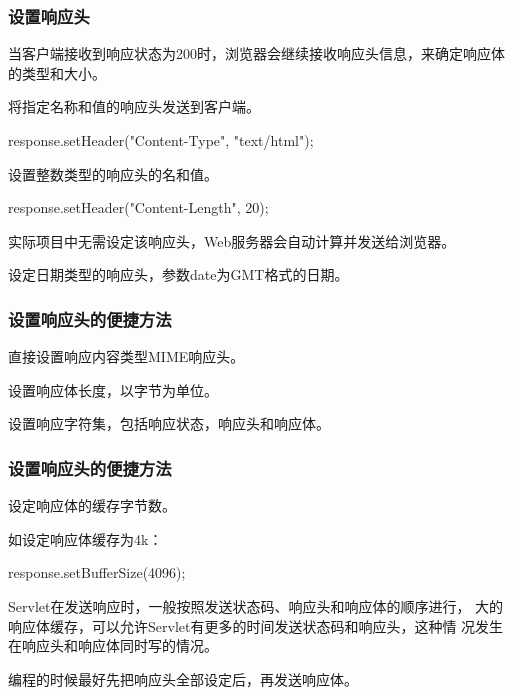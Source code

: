 \begin{frame}[fragile] %
\frametitle{设置响应头} 

{\hei 当客户端接收到响应状态为200时，浏览器会继续接收响应头信息，来确定响应体的类型和大小。}


将指定名称和值的响应头发送到客户端。
\begin{javaCode}
response.setHeader("Content-Type", "text/html");  
\end{javaCode}


设置整数类型的响应头的名和值。 
\begin{javaCode}
response.setHeader("Content-Length", 20);  
\end{javaCode}
{\kai 实际项目中无需设定该响应头，Web服务器会自动计算并发送给浏览器。}


设定日期类型的响应头，参数date为GMT格式的日期。
\end{frame}

\begin{frame}[fragile] %
\frametitle{设置响应头的便捷方法} 


直接设置响应内容类型MIME响应头。


设置响应体长度，以字节为单位。


设置响应字符集，包括响应状态，响应头和响应体。 
\end{frame}

\begin{frame}[fragile] %
\frametitle{设置响应头的便捷方法} 


设定响应体的缓存字节数。

如设定响应体缓存为4k：
\begin{javaCode}
response.setBufferSize(4096);  
\end{javaCode}

{\kai Servlet在发送响应时，一般按照发送状态码、响应头和响应体的顺序进行，
  大的响应体缓存，可以允许Servlet有更多的时间发送状态码和响应头，这种情
  况发生在响应头和响应体同时写的情况。}


编程的时候最好先把响应头全部设定后，再发送响应体。

\end{frame}

